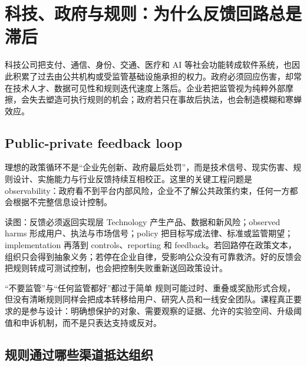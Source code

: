 \section{科技、政府与规则：为什么反馈回路总是滞后}

科技公司把支付、通信、身份、交通、医疗和 AI 等社会功能转成软件系统，也因此积累了过去由公共机构或受监管基础设施承担的权力。政府必须回应伤害，却常在技术人才、数据可见性和规则迭代速度上落后。企业若把监管视为纯粹外部摩擦，会失去塑造可执行规则的机会；政府若只在事故后执法，也会制造模糊和寒蝉效应。

\subsection{Public-private feedback loop}

理想的政策循环不是“企业先创新、政府最后处罚”，而是技术信号、现实伤害、规则设计、实施能力与行业反馈持续互相校正。这里的关键工程问题是 observability：政府看不到平台内部风险，企业不了解公共政策约束，任何一方都会根据不完整信息设计控制。


\begin{knowledgebox}{读图：反馈必须返回实现层}
Technology 产生产品、数据和新风险；observed harms 形成用户、执法与市场信号；policy 把目标写成法律、标准或监管期望；implementation 再落到 controls、reporting 和 feedback。若回路停在政策文本，组织只会得到抽象义务；若停在企业自律，受影响公众没有可靠救济。好的反馈会把规则转成可测试控制，也会把控制失败重新送回政策设计。
\end{knowledgebox}

\begin{warningbox}{“不要监管”与“任何监管都好”都过于简单}
规则可能过时、重叠或奖励形式合规，但没有清晰规则同样会把成本转移给用户、研究人员和一线安全团队。课程真正要求的是参与设计：明确想保护的对象、需要观察的证据、允许的实验空间、升级阈值和申诉机制，而不是只表达支持或反对。
\end{warningbox}


\subsection{规则通过哪些渠道抵达组织}

